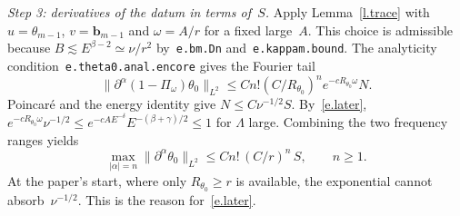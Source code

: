 \documentclass[11pt]{amsart}
\newcommand{\lab}[1]{\texttt{#1}}
\theoremstyle{remark}
\begin{document}
\emph{Step 3: derivatives of the datum in terms of~$S$.} Apply Lemma~\ref{l.trace} with $u=\theta_{m-1}$, $v=\mathbf b_{m-1}$ and $\omega=A/r$ for a fixed large~$A$. This choice is admissible because $B\lesssim E^{\beta-2}\simeq\nu/r^2$ by~\lab{e.bm.Dn} and~\lab{e.kappam.bound}. The analyticity condition~\lab{e.theta0.anal.encore} gives the Fourier tail
\begin{equation*}
\|\partial^\alpha(1-\Pi_\omega)\theta_0\|_{L^2}\leq Cn!(C/R_{\theta_0})^ne^{-cR_{\theta_0}\omega}N .
\end{equation*}
Poincaré and the energy identity give $N\leq C\nu^{-1/2}S$. By~\eqref{e.later}, $e^{-cR_{\theta_0}\omega}\nu^{-1/2}\leq e^{-cAE^{-\delta}}E^{-(\beta+\gamma)/2}\leq1$ for $\Lambda$ large. Combining the two frequency ranges yields
\begin{equation}
\label{e.trace.derivs}
\max_{|\alpha|=n}\|\partial^\alpha\theta_0\|_{L^2}\leq Cn!\,(C/r)^n\,S,\qquad n\geq1 .
\end{equation}
At the paper's start, where only $R_{\theta_0}\geq r$ is available, the exponential cannot absorb~$\nu^{-1/2}$. This is the reason for~\eqref{e.later}.
\end{document}
